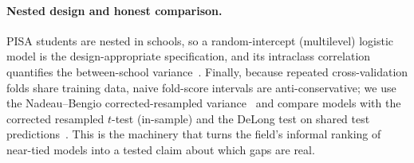 \paragraph{Nested design and honest comparison.}
PISA students are nested in schools, so a random-intercept (multilevel) logistic model
is the design-appropriate specification, and its intraclass correlation quantifies the
between-school variance~\citep{goldstein2011multilevel}. Finally, because repeated
cross-validation folds share training data, naive fold-score intervals are
anti-conservative; we use the Nadeau--Bengio corrected-resampled
variance~\citep{nadeau2003inference} and compare models with the corrected resampled
$t$-test (in-sample) and the DeLong test on shared test
predictions~\citep{delong1988}. This is the machinery that turns the field's informal
ranking of near-tied models into a tested claim about which gaps are real.

